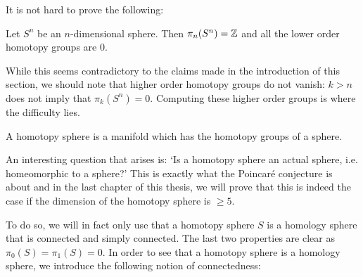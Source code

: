 It is not hard to prove the following:
\begin{prop}
    Let $S^{n}$ be an $n$-dimensional sphere.
    Then $\pi_n(S^{n}) = \mathbb{Z}$ and all the lower order homotopy groups are $0$.
\end{prop}
While this seems contradictory to the claims made in the introduction of this section, we should note that higher order homotopy groups do not vanish: $k > n$ does not imply that $\pi_k(S^{n}) = 0$.
Computing these higher order groups is where the difficulty lies.

\begin{definition}
    A homotopy sphere is a manifold which has the homotopy groups of a sphere.
\end{definition}

An interesting question that arises is: `Is a homotopy sphere an actual sphere, i.e. homeomorphic to a sphere?' This is exactly what the Poincaré conjecture is about and in the last chapter of this thesis, we will prove that this is indeed the case if the dimension of the homotopy sphere is $\ge 5$.

To do so, we will in fact only use that a homotopy sphere $S$ is a homology sphere that is connected and simply connected.
The last two properties are clear as $\pi_0(S) = \pi_1(S) = 0$.
In order to see that a homotopy sphere is a homology sphere, we introduce the following notion of connectedness:

